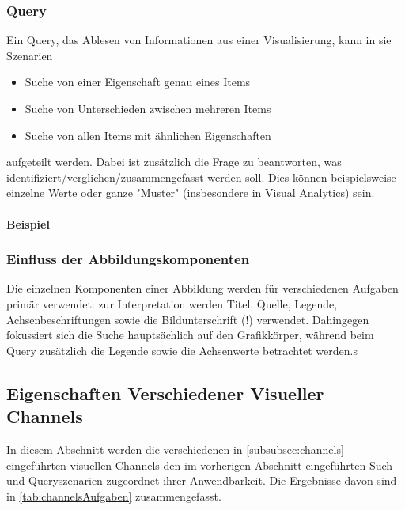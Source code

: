 			\subsubsection{Query}
				Ein Query, \dh das Ablesen von Informationen aus einer Visualisierung, kann in sie Szenarien
				\begin{itemize}
					\item {} Suche von einer Eigenschaft genau eines Items
					\item {}    Suche von Unterschieden zwischen mehreren Items
					\item {} Suche von allen Items mit ähnlichen Eigenschaften
				\end{itemize}
				aufgeteilt werden. Dabei ist zusätzlich die Frage zu beantworten, was identifiziert/verglichen/zusammengefasst werden soll. Dies können beispielsweise einzelne Werte oder ganze "Muster" (insbesondere in Visual Analytics) sein.

				\paragraph{Beispiel}

			\subsubsection{Einfluss der Abbildungskomponenten}
				Die einzelnen Komponenten einer Abbildung werden für verschiedenen Aufgaben primär verwendet: zur Interpretation werden Titel, Quelle, Legende, Achsenbeschriftungen sowie die Bildunterschrift (!) verwendet. Dahingegen fokussiert sich die Suche hauptsächlich auf den Grafikkörper, während beim Query zusätzlich die Legende sowie die Achsenwerte betrachtet werden.s

		\subsection{Eigenschaften Verschiedener Visueller Channels}
			In diesem Abschnitt werden die verschiedenen in \autoref{subsubsec:channels} eingeführten visuellen Channels den im vorherigen Abschnitt eingeführten Such- und Queryszenarien zugeordnet \bzgl ihrer Anwendbarkeit. Die Ergebnisse davon sind in \autoref{tab:channelsAufgaben} zusammengefasst.

